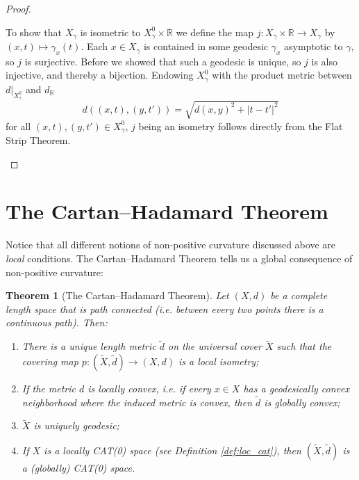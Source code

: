 \documentclass[11pt, a4paper, oneside]{memoir}
\theoremstyle{plain}\newtheorem{theorem}[subsection]{Theorem}
\theoremstyle{definition}
\newcommand{\parenum}{\setenumerate[1]{label=\textbf{(\arabic*)}}}
\newcommand{\twiddle}[1]{\widetilde{#1}}
\newcommand{\R}{\mathbb{R}}
\begin{document}
\begin{proof}
\begin{enumerate}
To show that \(X_\gamma\) is isometric to \(X_\gamma^0\times\R\) we define the map \(j:X_\gamma\times\R\to X_\gamma\) by \((x,t)\mapsto \gamma_x(t)\).
Each \(x\in X_\gamma\) is contained in some geodesic \(\gamma_x\) asymptotic to \(\gamma\), so \(j\) is surjective.
Before we showed that such a geodesic is unique, so \(j\) is also injective, and thereby a bijection.
Endowing \(X_\gamma^0\) with the product metric between \(d|_{X_\gamma^0}\) and \(d_\R\)
\[d((x,t),(y,t'))=\sqrt{d(x,y)^2+|t-t'|^2}\]
for all \((x,t),(y,t')\in X_{\gamma}^0\), \(j\) being an isometry follows directly from the Flat Strip Theorem.
\end{enumerate}
\end{proof}


\section{The Cartan--Hadamard Theorem}
Notice that all different notions of non-positive curvature discussed above are \textit{local} conditions.
The Cartan--Hadamard Theorem tells us a global consequence of non-positive curvature:
\begin{theorem}[The Cartan--Hadamard Theorem]\label{thm:CHT}
    Let \((X,d)\) be a complete length space that is  path connected (i.e. between every two points there is a continuous path).
    Then:
\parenum\begin{enumerate}
    \item There is a unique length metric \(\twiddle{d}\) on the universal cover \(\twiddle{X}\) such that the covering map \(p:(\twiddle{X},\twiddle{d})\to (X,d)\) is a local isometry;
    \item If the metric \(d\) is locally convex, i.e. if every \(x\in X\) has a geodesically convex neighborhood where the induced metric is convex, then \(\twiddle{d}\) is globally convex;
    \item \(\twiddle{X}\) is uniquely geodesic;
    \item If \(X\) is a locally CAT(0) space (see Definition \ref{def:loc_cat}), then \((\twiddle{X},\twiddle{d})\) is a (globally) CAT(0) space.
\end{enumerate}
\end{theorem}
\end{document}
